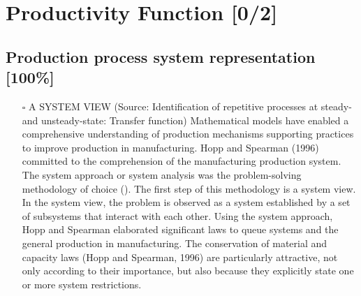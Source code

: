 \documentclass{article}
\begin{document}
\section{Productivity Function [0/2]}
\label{sec:orgc7ed887}
\subsection{Production process system representation [100\%]}
\label{sec:org644cc3c}

\begin{itemize}
\item[{$\square$}] A SYSTEM VIEW (Source: Identification of repetitive processes at steady- and unsteady-state: Transfer function)
Mathematical models have enabled a comprehensive understanding of production mechanisms supporting practices to improve production in manufacturing.
Hopp and Spearman (1996) committed to the comprehension of the manufacturing production system.
The system approach or system analysis was the problem-solving methodology of choice (\citep{Hopp2001}).
The first step of this methodology is a system view.
In the system view, the problem is observed as a system established by a set of subsystems that interact with each other.
Using the system approach, Hopp and Spearman elaborated significant laws to queue systems and the general production in manufacturing.
The conservation of material and capacity laws (Hopp and Spearman, 1996) are particularly attractive, not only according to their importance, but also because they explicitly state one or more system restrictions.


\end{itemize}
\end{document}
